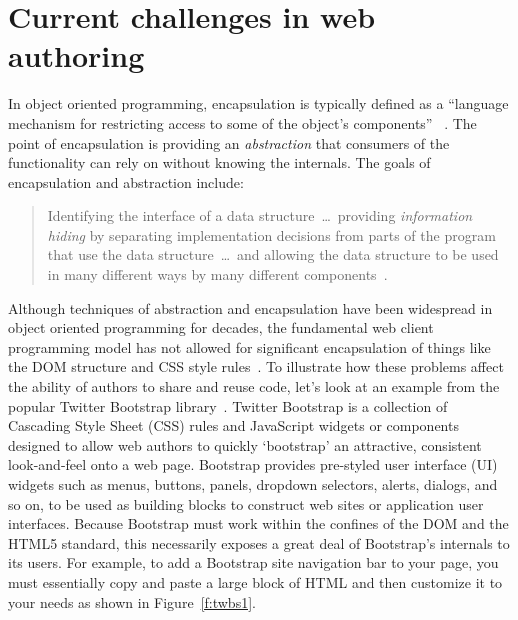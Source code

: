 \section{Current challenges in web authoring}
In object oriented programming, encapsulation is typically defined as a 
``language mechanism for restricting access to some of the object's components''
~\cite[p. 522]{mitchell2003}.
The point of encapsulation is providing an \textit{abstraction} that consumers of the functionality can rely on without knowing the internals. 
The goals of encapsulation and abstraction include:
\begin{quote}
Identifying the interface of a data structure~\dots~providing \textit{information hiding} by separating implementation decisions from parts of the program that use the data 
structure~\dots~and allowing the data structure to be used in many different ways by many different components~\cite[p. 243]{mitchell2003}.
\end{quote}

Although techniques of abstraction and encapsulation have been widespread in object oriented programming for decades,
the fundamental web client programming model has not allowed for significant encapsulation of things like the DOM structure and CSS style rules~\cite{ihrig2012}.
To illustrate how these problems affect the ability of authors to share and reuse code, let's look at an example from the popular Twitter Bootstrap library~\cite{bootstrapcontributors2015}.
Twitter Bootstrap is a collection of Cascading Style Sheet (CSS) rules and JavaScript widgets or components designed to allow web authors to quickly `bootstrap' an attractive, consistent look-and-feel onto a web page.
Bootstrap provides pre-styled user interface (UI) widgets such as menus, buttons, panels, dropdown selectors, alerts, dialogs, and so on, to be used as building blocks to construct web sites or application user interfaces.
Because Bootstrap must work within the confines of the DOM and the HTML5 standard, this necessarily exposes a great deal of Bootstrap's internals to its users.
For example, to add a Bootstrap site navigation bar to your page, you must essentially copy and paste a large block of HTML and then customize it to your needs as shown in Figure~\ref{f:twbs1}.

